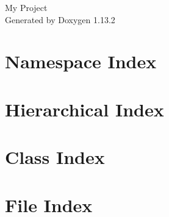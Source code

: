 \documentclass[twoside]{book}
\newcommand{\+}{\discretionary{\mbox{\scriptsize$\hookleftarrow$}}{}{}}
\newcommand{\clearemptydoublepage}{%
    \newpage{\pagestyle{empty}\cleardoublepage}%
  }
\begin{document}
  \raggedbottom
    \hypersetup{pageanchor=false,
                bookmarksnumbered=true,
                pdfencoding=unicode
               }
  \begin{titlepage}
  \vspace*{7cm}
  \begin{center}%
  {\Large My Project}\\
  \vspace*{1cm}
  {\large Generated by Doxygen 1.13.2}\\
  \end{center}
  \end{titlepage}
  \clearemptydoublepage
  \tableofcontents
  \clearemptydoublepage
  \hypersetup{pageanchor=true}

\chapter{Namespace Index}

\chapter{Hierarchical Index}

\chapter{Class Index}

\chapter{File Index}

\end{document}
